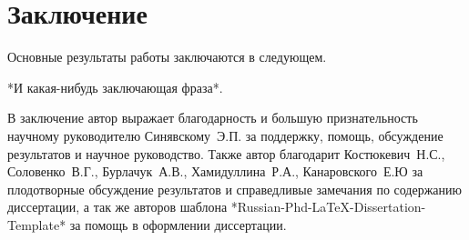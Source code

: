 \chapter*{Заключение}						%


Основные результаты работы заключаются в следующем.


*И какая-нибудь заключающая фраза*.

В заключение автор выражает благодарность и большую признательность научному руководителю
Синявскому~Э.П. за поддержку, помощь, обсуждение результатов и научное
руководство. Также автор благодарит Костюкевич~Н.С., Соловенко~В.Г., Бурлачук~А.В., Хамидуллина~Р.А., Канаровского~Е.Ю за плодотворные обсуждение результатов и справедливые замечания по содержанию диссертации, а так же авторов шаблона
*Russian-Phd-LaTeX-Dissertation-Template* за помощь в оформлении
диссертации.
